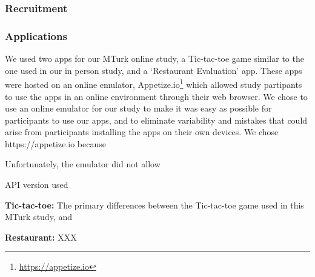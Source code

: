 \documentclass{sig-alternate-05-2015}
\begin{document}
\subsubsection{Recruitment}






\subsubsection{Applications}

We used two apps for our MTurk online study, a Tic-tac-toe game similar to the one used in our in person study, and a `Restaurant Evaluation' app. These apps were hosted on an online emulator, Appetize.io\footnote{\url{https://appetize.io}} which allowed study partipants to use the apps in an online environment through their web browser. We chose to use an online emulator for our study to make it was easy as possible for participants to use our apps, and to eliminate variability and mistakes that could arise from participants installing the apps on their own devices. We chose https://appetize.io because

Unfortunately, the emulator did not allow

API version used










\noindent
\textbf{Tic-tac-toe: }The primary differences between the Tic-tac-toe game used in this MTurk study, and




\noindent
\textbf{Restaurant: }XXX
\end{document}
